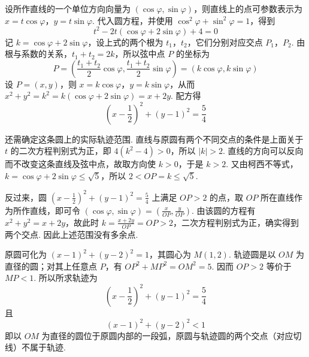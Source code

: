 \documentclass[UTF8,a4paper,oneside,11pt]{ctexbook}
\begin{document}
\begin{solution}
设所作直线的一个单位方向向量为 \((\cos\varphi,\sin\varphi)\)，则直线上的点可参数表示为 \(x=t\cos\varphi\)，\(y=t\sin\varphi\). 代入圆方程，并使用 \(\cos^2\varphi+\sin^2\varphi=1\)，得到
\[
t^2-2t(\cos\varphi+2\sin\varphi)+4=0
\]
记 \(k=\cos\varphi+2\sin\varphi\)，设上式的两个根为 \(t_1\)，\(t_2\)，它们分别对应交点 \(P_1\)，\(P_2\). 由根与系数的关系，\(t_1+t_2=2k\)，所以弦中点 \(P\) 的坐标为
\[
P=\left(\frac{t_1+t_2}{2}\cos\varphi,\frac{t_1+t_2}{2}\sin\varphi\right)=(k\cos\varphi,k\sin\varphi)
\]
设 \(P=(x,y)\)，则 \(x=k\cos\varphi\)，\(y=k\sin\varphi\)，从而 \(x^2+y^2=k^2=k(\cos\varphi+2\sin\varphi)=x+2y\). 配方得
\[
\left(x-\frac{1}{2}\right)^2+(y-1)^2=\frac{5}{4}
\]

还需确定这条圆上的实际轨迹范围. 直线与原圆有两个不同交点的条件是上面关于 \(t\) 的二次方程判别式为正，即 \(4(k^2-4)>0\)，所以 \(|k|>2\). 直线的方向可以反向而不改变这条直线及弦中点，故取方向使 \(k>0\)，于是 \(k>2\). 又由柯西不等式，\(k=\cos\varphi+2\sin\varphi\leqslant\sqrt{5}\)，所以 \(2<OP=k\leqslant\sqrt{5}\).

反过来，圆 \(\left(x-\frac{1}{2}\right)^2+(y-1)^2=\frac{5}{4}\) 上满足 \(OP>2\) 的点，取 \(OP\) 所在直线作为所作直线，即可令 \((\cos\varphi,\sin\varphi)=\left(\frac{x}{OP},\frac{y}{OP}\right)\). 由该圆的方程有 \(x^2+y^2=x+2y\)，故此时 \(k=\frac{x+2y}{OP}=OP>2\)，二次方程判别式为正，确实得到两个交点. 因此上述范围没有多余点.

原圆可化为 \((x-1)^2+(y-2)^2=1\)，其圆心为 \(M(1,2)\). 轨迹圆是以 \(OM\) 为直径的圆；对其上任意点 \(P\)，有 \(OP^2+MP^2=OM^2=5\). 因而 \(OP>2\) 等价于 \(MP<1\). 所以所求轨迹为
\[
\left(x-\frac{1}{2}\right)^2+(y-1)^2=\frac{5}{4}
\]
且
\[
(x-1)^2+(y-2)^2<1
\]
即以 \(OM\) 为直径的圆位于原圆内部的一段弧，原圆与轨迹圆的两个交点（对应切线）不属于轨迹.
\end{solution}

\end{document}
